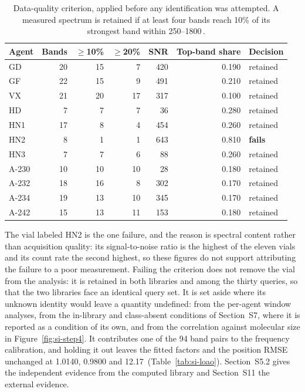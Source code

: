 \begin{table}[htbp]
\centering
\caption{Data-quality criterion, applied before any identification was attempted. A measured spectrum is retained if at least four bands reach 10\% of its strongest band within 250--1800\,\wn{}.}
\label{tab:si-quality}
\small
\begin{tabular}{lrrrrrl}
\toprule
Agent & Bands & $\geq$10\% & $\geq$20\% & SNR & Top-band share & Decision \\
\midrule
GD & 20 & 15 & 7 & 420 & 0.190 & retained \\
GF & 22 & 15 & 9 & 491 & 0.210 & retained \\
VX & 21 & 20 & 17 & 317 & 0.100 & retained \\
HD & 7 & 7 & 7 & 36 & 0.280 & retained \\
HN1 & 17 & 8 & 4 & 454 & 0.260 & retained \\
HN2 & 8 & 1 & 1 & 643 & 0.810 & \textbf{fails} \\
HN3 & 7 & 7 & 6 & 88 & 0.260 & retained \\
A-230 & 10 & 10 & 10 & 28 & 0.180 & retained \\
A-232 & 18 & 16 & 8 & 302 & 0.170 & retained \\
A-234 & 19 & 13 & 10 & 345 & 0.170 & retained \\
A-242 & 15 & 13 & 11 & 153 & 0.180 & retained \\
\bottomrule
\end{tabular}

\begin{flushleft}\footnotesize The vial labeled HN2 is the one failure, and the reason is spectral content rather than acquisition quality: its signal-to-noise ratio is the highest of the eleven vials and its count rate the second highest, so these figures do not support attributing the failure to a poor measurement. Failing the criterion does not remove the vial from the analysis: it is retained in both libraries and among the thirty queries, so that the two libraries face an identical query set. It is set aside where its unknown identity would leave a quantity undefined: from the per-agent window analyses, from the in-library and class-absent conditions of Section~S7, where it is reported as a condition of its own, and from the correlation against molecular size in Figure~\ref{fig:si-step4}. It contributes one of the 94 band pairs to the frequency calibration, and holding it out leaves the fitted factors and the position RMSE unchanged at 1.0140, 0.9800 and 12.17\,\wn{} (Table~\ref{tab:si-loao}). Section~S5.2 gives the independent evidence from the computed library and Section~S11 the external evidence.\end{flushleft}
\end{table}
